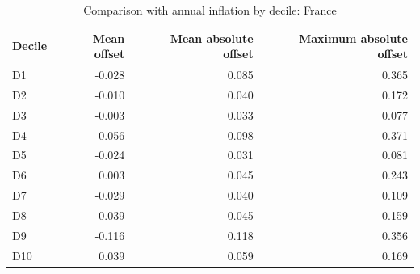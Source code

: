 \begin{table}

\caption{\label{tab:fr-decile-validation}Comparison with annual inflation by decile: France}
\centering
\begin{tabular}[t]{lrrr}
\toprule
Decile & Mean offset & Mean absolute offset & Maximum absolute offset\\
\midrule
D1 & -0.028 & 0.085 & 0.365\\
D2 & -0.010 & 0.040 & 0.172\\
D3 & -0.003 & 0.033 & 0.077\\
D4 & 0.056 & 0.098 & 0.371\\
D5 & -0.024 & 0.031 & 0.081\\
\addlinespace
D6 & 0.003 & 0.045 & 0.243\\
D7 & -0.029 & 0.040 & 0.109\\
D8 & 0.039 & 0.045 & 0.159\\
D9 & -0.116 & 0.118 & 0.356\\
D10 & 0.039 & 0.059 & 0.169\\
\bottomrule
\end{tabular}
\end{table}
